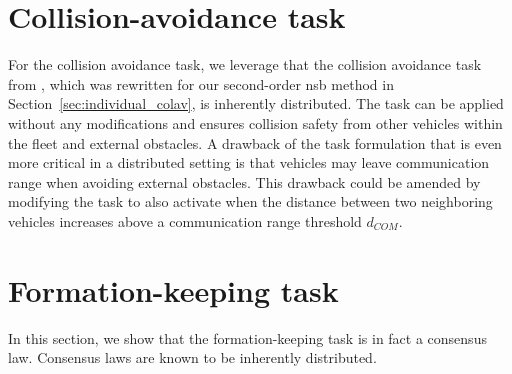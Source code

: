 \section{Collision-avoidance task}
For the collision avoidance task, we leverage that the collision avoidance task from \cite{arrichiello_formation_2006}, which was rewritten for our second-order \gls{nsb} method in Section~\ref{sec:individual_colav}, is inherently distributed. The task can be applied without any modifications and ensures collision safety from other vehicles within the fleet and external obstacles. A drawback of the task formulation that is even more critical in a distributed setting is that vehicles may leave communication range when avoiding external obstacles. This drawback could be amended by modifying the task to also activate when the distance between two neighboring vehicles increases above a communication range threshold $d_{COM}$.

\section{Formation-keeping task}
In this section, we show that the formation-keeping task is in fact a consensus law. Consensus laws are known to be inherently distributed.

